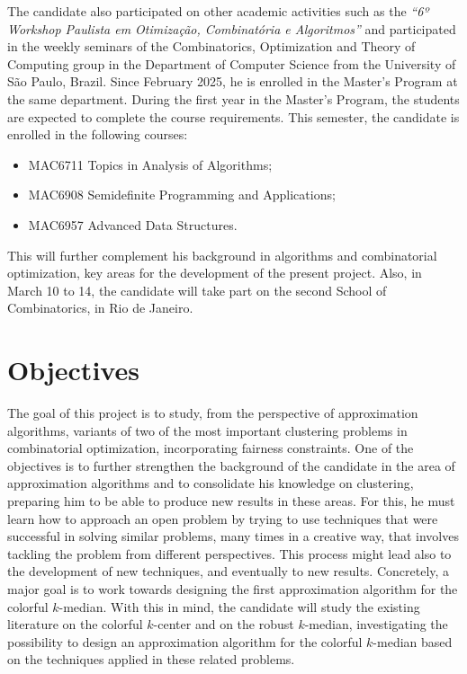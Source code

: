 \documentclass[12pt]{article}
\begin{document}
The candidate also participated on other academic activities such as the \emph{``6º Workshop Paulista em Otimização, Combinatória e Algoritmos''} and participated in the weekly seminars of the Combinatorics, Optimization and Theory of Computing group in the Department of Computer Science from the University of São Paulo, Brazil.
Since February 2025, he is enrolled in the Master's Program at the same department.
During the first year in the Master's Program, the students are expected to complete the course requirements. 
This semester, the candidate is enrolled in the following courses: 
\begin{itemize} 
  \item MAC6711 Topics in Analysis of Algorithms;
  \item MAC6908 Semidefinite Programming and Applications;
  \item MAC6957 Advanced Data Structures.
\end{itemize}
This will further complement his background in algorithms and combinatorial optimization, key areas for the development of the present project.  Also, in March 10 to 14, the candidate will take part on the second School of Combinatorics, in Rio de Janeiro.


\section{Objectives}


The goal of this project is to study, from the perspective of approximation algorithms, variants of two of 
the most important clustering problems in combinatorial optimization, incorporating fairness constraints.
One of the objectives is to further strengthen the background of the candidate in the area of approximation algorithms
and to consolidate his knowledge on clustering, preparing him to be able to produce new results in these areas.  
For this, he must learn how to approach an open problem by trying to use techniques that were successful in solving 
similar problems, many times in a creative way, that involves tackling the problem from different perspectives.  
This process might lead also to the development of new techniques, and eventually to new results. 
Concretely, a major goal is to work towards designing the first approximation algorithm for the colorful $k$-median. 
With this in mind, the candidate will study the existing literature on the colorful $k$-center and on the robust $k$-median, 
investigating the possibility to design an approximation algorithm for the colorful $k$-median based 
on the techniques applied in these related problems.
\end{document}
